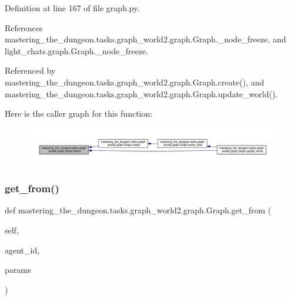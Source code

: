 Definition at line 167 of file graph.\+py.



References mastering\+\_\+the\+\_\+dungeon.\+tasks.\+graph\+\_\+world2.\+graph.\+Graph.\+\_\+node\+\_\+freeze, and light\+\_\+chats.\+graph.\+Graph.\+\_\+node\+\_\+freeze.



Referenced by mastering\+\_\+the\+\_\+dungeon.\+tasks.\+graph\+\_\+world2.\+graph.\+Graph.\+create(), and mastering\+\_\+the\+\_\+dungeon.\+tasks.\+graph\+\_\+world2.\+graph.\+Graph.\+update\+\_\+world().

Here is the caller graph for this function\+:
\nopagebreak
\begin{figure}[H]
\begin{center}
\leavevmode
\includegraphics[width=350pt]{classmastering__the__dungeon_1_1tasks_1_1graph__world2_1_1graph_1_1Graph_a240dae7d7d9f8bbaa53750d21e0d17c5_icgraph}
\end{center}
\end{figure}
\mbox{\label{classmastering__the__dungeon_1_1tasks_1_1graph__world2_1_1graph_1_1Graph_a3b953eab2aa57119b16c108db7ed0656}} 
\subsubsection{\texorpdfstring{get\+\_\+from()}{get\_from()}}
{\footnotesize\ttfamily def mastering\+\_\+the\+\_\+dungeon.\+tasks.\+graph\+\_\+world2.\+graph.\+Graph.\+get\+\_\+from (\begin{DoxyParamCaption}\item[{}]{self,  }\item[{}]{agent\+\_\+id,  }\item[{}]{params }\end{DoxyParamCaption})}



